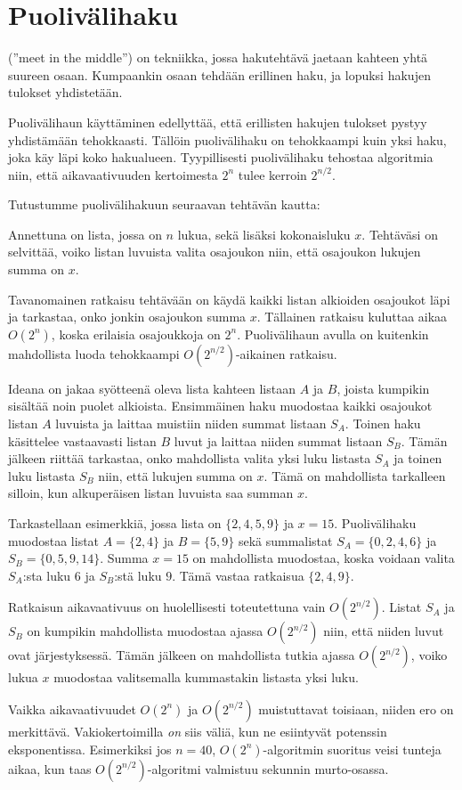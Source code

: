 \section{Puolivälihaku}


 (''meet in the middle'') on tekniikka,
jossa hakutehtävä jaetaan kahteen yhtä suureen osaan.
Kumpaankin osaan tehdään erillinen haku,
ja lopuksi hakujen tulokset yhdistetään.

Puolivälihaun käyttäminen edellyttää,
että erillisten hakujen tulokset pystyy
yhdistämään tehokkaasti.
Tällöin puolivälihaku on tehokkaampi
kuin yksi haku, joka käy läpi koko hakualueen.
Tyypillisesti puolivälihaku tehostaa algoritmia
niin, että aikavaativuuden kertoimesta $2^n$
tulee kerroin $2^{n/2}$.

\begin{samepage}
Tutustumme puolivälihakuun seuraavan tehtävän kautta:
\begin{task}
Annettuna on lista, jossa on $n$ lukua,
sekä lisäksi kokonaisluku $x$.
Tehtäväsi on selvittää, voiko listan luvuista
valita osajoukon niin, että osajoukon lukujen summa on $x$.
\end{task}
\end{samepage}

Tavanomainen ratkaisu tehtävään on käydä kaikki
listan alkioiden osajoukot läpi ja tarkastaa,
onko jonkin osajoukon summa $x$.
Tällainen ratkaisu kuluttaa aikaa $O(2^n)$,
koska erilaisia osajoukkoja on $2^n$.
Puolivälihaun avulla on kuitenkin mahdollista luoda
tehokkaampi $O(2^{n/2})$-aikainen ratkaisu.

Ideana on jakaa syötteenä oleva lista
kahteen listaan $A$ ja $B$,
joista kumpikin sisältää noin puolet alkioista.
Ensimmäinen haku muodostaa kaikki osajoukot
listan $A$ luvuista ja laittaa muistiin niiden summat
listaan $S_A$.
Toinen haku käsittelee vastaavasti listan $B$ luvut
ja laittaa niiden summat listaan $S_B$.
Tämän jälkeen riittää tarkastaa,
onko mahdollista valita yksi luku listasta $S_A$
ja toinen luku listasta $S_B$ niin,
että lukujen summa on $x$.
Tämä on mahdollista tarkalleen silloin,
kun alkuperäisen listan luvuista saa summan $x$.

Tarkastellaan esimerkkiä,
jossa lista on $\{2,4,5,9\}$
ja $x=15$.
Puolivälihaku muodostaa listat $A=\{2,4\}$
ja $B=\{5,9\}$ sekä summalistat
$S_A=\{0,2,4,6\}$ ja $S_B=\{0,5,9,14\}$.
Summa $x=15$ on mahdollista muodostaa,
koska voidaan valita $S_A$:sta luku $6$
ja $S_B$:stä luku $9$.
Tämä vastaa ratkaisua $\{2,4,9\}$.

Ratkaisun aikavaativuus on huolellisesti toteutettuna
vain $O(2^{n/2})$.
Listat $S_A$ ja $S_B$ on kumpikin mahdollista
muodostaa ajassa $O(2^{n/2})$ niin,
että niiden luvut ovat järjestyksessä.
Tämän jälkeen on mahdollista tutkia ajassa
$O(2^{n/2})$, voiko lukua $x$ muodostaa
valitsemalla kummastakin listasta yksi luku.

Vaikka aikavaativuudet $O(2^n)$ ja $O(2^{n/2})$
muistuttavat toisiaan, niiden ero on merkittävä.
Vakiokertoimilla \emph{on} siis väliä, kun ne esiintyvät
potenssin eksponentissa.
Esimerkiksi jos $n=40$, $O(2^n)$-algoritmin suoritus
veisi tunteja aikaa, kun taas $O(2^{n/2})$-algoritmi
valmistuu sekunnin murto-osassa.


